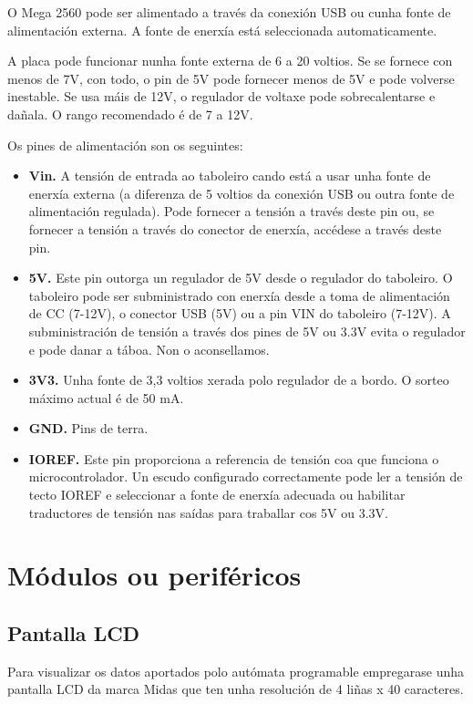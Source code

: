 \documentclass[11pt,twoside]{book}
\begin{document}
O Mega 2560 pode ser alimentado a través da conexión USB ou cunha fonte de alimentación externa. A fonte de enerxía está seleccionada automaticamente. 

A placa pode funcionar nunha fonte externa de 6 a 20 voltios. Se se fornece con menos de 7V, con todo, o pin de 5V pode fornecer menos de 5V e pode volverse inestable. Se usa máis de 12V, o regulador de voltaxe pode sobrecalentarse e dañala. O rango recomendado é de 7 a 12V.

Os pines de alimentación son os seguintes:

\begin{itemize}
\item \textbf{Vin.} A tensión de entrada ao taboleiro cando está a usar unha fonte de enerxía externa (a diferenza de 5 voltios da conexión USB ou outra fonte de alimentación regulada). Pode fornecer a tensión a través deste pin ou, se fornecer a tensión a través do conector de enerxía, accédese a través deste pin.
\item \textbf{5V.} Este pin outorga un regulador de 5V desde o regulador do taboleiro. O taboleiro pode ser subministrado con enerxía desde a toma de alimentación de CC (7-12V), o conector USB (5V) ou a pin VIN do taboleiro (7-12V). A subministración de tensión a través dos pines de 5V ou 3.3V evita o regulador e pode danar a táboa. Non o aconsellamos.
\item \textbf{3V3.} Unha fonte de 3,3 voltios xerada polo regulador de a bordo. O sorteo máximo actual é de 50 mA.
\item \textbf{GND.} Pins de terra.
\item \textbf{IOREF.} Este pin proporciona a referencia de tensión coa que funciona o microcontrolador. Un escudo configurado correctamente pode ler a tensión de tecto IOREF e seleccionar a fonte de enerxía adecuada ou habilitar traductores de tensión nas saídas para traballar cos 5V ou 3.3V.
\end{itemize}

\section{Módulos ou periféricos}

\subsection{Pantalla LCD}

Para visualizar os datos aportados polo autómata programable empregarase unha pantalla LCD da marca Midas que ten unha resolución de 4 liñas x 40 caracteres. 
\end{document}
